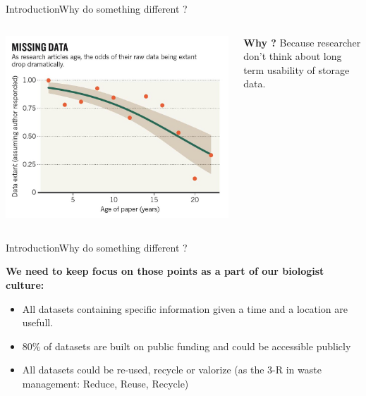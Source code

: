 \documentclass[table]{eecslides}
\begin{document}
\begin{frame}{Introduction}{Why do something different ?}


\begin{columns}[c]
	\begin{column}{.50\paperwidth}
		\includegraphics[width=.50\paperwidth]{Nature_fig.jpg}
	\end{column}
	\begin{column}{.4\paperwidth}
		\textbf{Why ?} Because researcher don't think about long term usability of storage data.
	\end{column}
\end{columns}

\end{frame}


\begin{frame}{Introduction}{Why do something different ?}

\textbf{We need to keep focus on those points as a part of our biologist culture:}
	
	\begin{itemize}
		\item \alert{All datasets} containing specific information given a time and a location \alert{are usefull}.
		\item 80\% of datasets are built on \alert{public funding} \citep{Graham2013} and could be accessible publicly
		\item All datasets could be re-used, recycle or valorize (as the 3-R in waste management: Reduce, Reuse, Recycle) 
	\end{itemize}


\end{frame}
\end{document}
